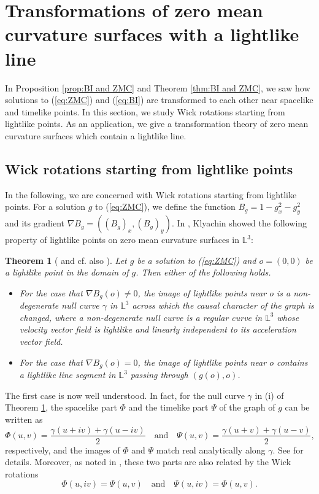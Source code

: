 \documentclass[12pt,amstex]{amsart}%
\theoremstyle{plain} %
\newtheorem{theorem}{Theorem}[section]
\theoremstyle{definition}
\begin{document}
\section{Transformations of zero mean curvature surfaces with a lightlike line}\label{Sec.4}
In Proposition \ref{prop:BI and ZMC} and Theorem \ref{thm:BI and ZMC}, we saw how solutions to (\ref{eq:ZMC}) and (\ref{eq:BI}) are transformed to each other near spacelike and timelike points. In this section, we study Wick rotations starting from lightlike points. As an application, we give a transformation theory of zero mean curvature surfaces which contain a lightlike line.

\subsection{Wick rotations starting from lightlike points}
In the following, we are concerned with Wick rotations starting from lightlike points. For a solution $g$ to (\ref{eq:ZMC}), we define the function $B_g=1-g_x^2-g_y^2$ and its gradient $\nabla{B_g}=((B_g)_x,(B_g)_y)$. In \cite{Klyachin}, Klyachin showed the following property of lightlike points on zero mean curvature surfaces in $\mathbb{L}^3$:
\begin{theorem}[\cite{Klyachin} and cf. also \cite{UY}]\label{thm:Klyachin}
Let $g$ be a solution to (\ref{eq:ZMC}) and $o=(0,0)$ be a lightlike point in the domain of $g$. Then either of the following holds.
\begin{itemize}
\item [(i)] For the case that $\nabla{B_g}(o)\neq0$, the image of lightlike points near $o$ is a non-degenerate null curve $\gamma$ in $\mathbb{L}^3$ across which the causal character of the graph is changed, where a non-degenerate null curve is a regular curve in $\mathbb{L}^3$ whose velocity vector field is lightlike and linearly independent to its acceleration vector field.
\item[(ii)] For the case that $\nabla{B_g}(o)=0$, the image of lightlike points near $o$ contains a lightlike line segment in $\mathbb{L}^3$ passing through $(g(o),o)$.
\end{itemize}
\end{theorem}
The first case is now well understood. In fact, for the null curve $\gamma$ in (i) of Theorem \ref{thm:Klyachin}, the spacelike part $\Phi$ and the timelike part $\Psi$ of the graph of $g$ can be written as 
\begin{equation}\label{eq:ZMCext}
  \Phi(u,v)=\frac{\gamma(u+iv)+\gamma(u-iv)}{2}\quad \text{and}\quad 
  \Psi(u,v)=\frac{\gamma(u+v)+\gamma(u-v)}{2},
\end{equation}
respectively, and the images of $\Phi$ and $\Psi$ match real analytically along $\gamma$. See \cite{FujimoriETAL3,Gu,KKSY,Klyachin} for details.
Moreover, as noted in \cite[Section 2]{KKSY}, these two parts are also related by the Wick rotations
\[
\Phi(u,iv)=\Psi(u,v)\quad \text{and}\quad \Psi(u,iv)=\Phi(u,v).
\]
\end{document}
